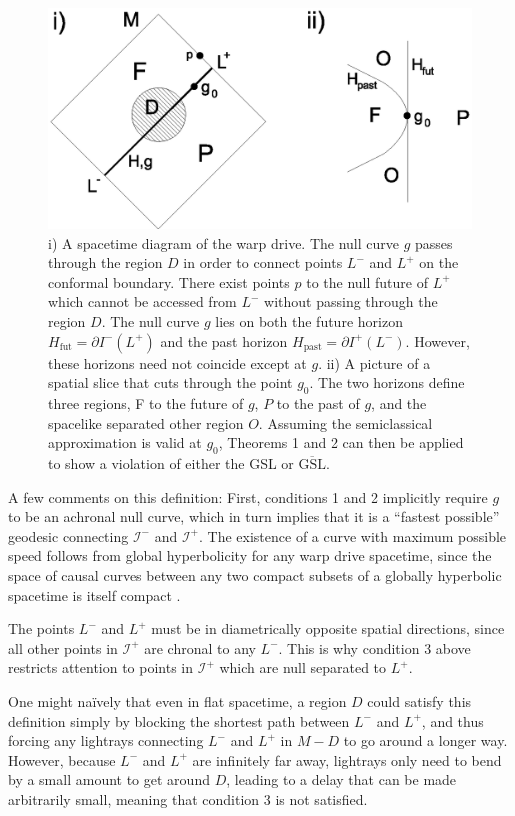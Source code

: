 \documentclass{article}
\begin{document}
\begin{figure}[ht]
\centering
\includegraphics[width=.9\textwidth]{warp2.eps}
\caption{\small{
i) A spacetime diagram of the warp drive.  The null curve $g$ passes through the region $D$ in order to connect points $L^-$ and $L^+$ on the conformal boundary.  There exist points $p$ to the null future of $L^+$ which cannot be accessed from $L^-$ without passing through the region $D$.  The null curve $g$ lies on both the future horizon $H_\mathrm{fut} = \partial I^-(L^+)$ and the  past horizon $H_\mathrm{past} = \partial I^+(L^-)$.  However, these horizons need not coincide except at $g$.  ii) A picture of a spatial slice that cuts through the point $g_0$.  The two horizons define three regions, F to the future of $g$, $P$ to the past of $g$, and the spacelike separated other region $O$.  Assuming the semiclassical approximation is valid at $g_0$, Theorems 1 and 2 can then be applied to show a violation of either the GSL or $\overline{\mathrm{GSL}}$.
}}\label{warp2}
\end{figure}

A few comments on this definition: First, conditions 1 and 2 implicitly require $g$ to be an achronal null curve, which in turn implies that it is a ``fastest possible'' geodesic connecting $\mathcal{I}^-$ and $\mathcal{I}^+$.  The existence of a curve with maximum possible speed follows from global hyperbolicity for any warp drive spacetime, since the space of causal curves between any two compact subsets of a globally hyperbolic spacetime is itself compact \cite{SW96}.  

The points $L^-$ and $L^+$ must be in diametrically opposite spatial directions, since all other points in $\mathcal{I}^+$ are chronal to any $L^-$.  This is why condition 3 above restricts attention to points in $\mathcal{I}^+$ which are null separated to $L^+$.

One might na\"{i}vely that even in flat spacetime, a region $D$ could satisfy this definition simply by blocking the shortest path between $L^-$ and $L^+$, and thus forcing any lightrays connecting $L^-$ and $L^+$ in $M - D$ to go around a longer way.  However, because $L^-$ and $L^+$ are infinitely far away, lightrays only need to bend by a small amount to get around $D$, leading to a delay that can be made arbitrarily small, meaning that condition 3 is not satisfied.
\end{document}
